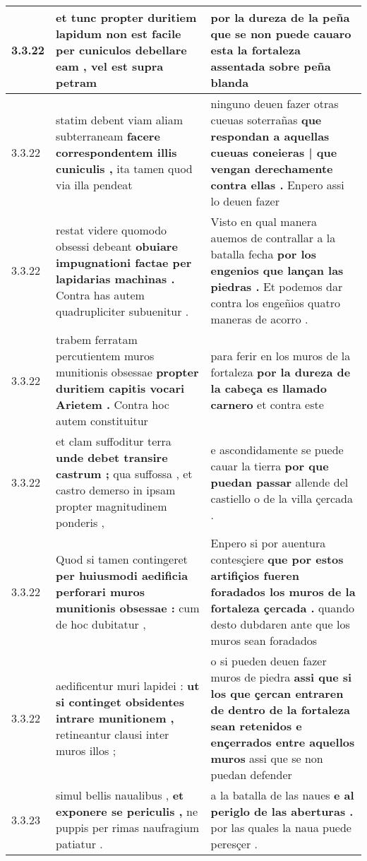 \begin{tabular}{|p{1cm}|p{6.5cm}|p{6.5cm}|}
3.3.22 & et tunc propter duritiem lapidum \textbf{ non est facile per cuniculos debellare eam , } vel est supra petram & por la dureza de la peña \textbf{ que se non puede } cauaro esta la fortaleza assentada sobre peña blanda \\\hline
3.3.22 & statim debent viam aliam subterraneam \textbf{ facere correspondentem illis cuniculis , } ita tamen quod via illa pendeat & ninguno deuen fazer otras cueuas soterrañas \textbf{ que respondan a aquellas cueuas coneieras | que vengan derechamente contra ellas . } Enpero assi lo deuen fazer \\\hline
3.3.22 & restat videre quomodo obsessi debeant \textbf{ obuiare impugnationi factae per lapidarias machinas . } Contra has autem quadrupliciter subuenitur . & Visto en qual manera auemos de contrallar a la batalla fecha \textbf{ por los engenios que lançan las piedras . } Et podemos dar contra los engeñios quatro maneras de acorro . \\\hline
3.3.22 & trabem ferratam percutientem muros munitionis obsessae \textbf{ propter duritiem capitis vocari Arietem . } Contra hoc autem constituitur & para ferir en los muros de la fortaleza \textbf{ por la dureza de la cabeça es llamado carnero } et contra este \\\hline
3.3.22 & et clam suffoditur terra \textbf{ unde debet transire castrum ; } qua suffossa , et castro demerso in ipsam propter magnitudinem ponderis , & e ascondidamente se puede cauar la tierra \textbf{ por que puedan passar } allende del castiello o de la villa çercada . \\\hline
3.3.22 & Quod si tamen contingeret \textbf{ per huiusmodi aedificia perforari muros munitionis obsessae : } cum de hoc dubitatur , & Enpero si por auentura contesçiere \textbf{ que por estos artifiçios fueren foradados los muros de la fortaleza çercada . } quando desto dubdaren ante que los muros sean foradados \\\hline
3.3.22 & aedificentur muri lapidei : \textbf{ ut si continget obsidentes intrare munitionem , } retineantur clausi inter muros illos ; & o si pueden deuen fazer muros de piedra \textbf{ assi que si los que çercan entraren de dentro de la fortaleza sean retenidos e ençerrados entre aquellos muros } assi que se non puedan defender \\\hline
3.3.23 & simul bellis naualibus , \textbf{ et exponere se periculis , } ne puppis per rimas naufragium patiatur . & a la batalla de las naues \textbf{ e al periglo de las aberturas . } por las quales la naua puede peresçer . \\\hline

\end{tabular}
